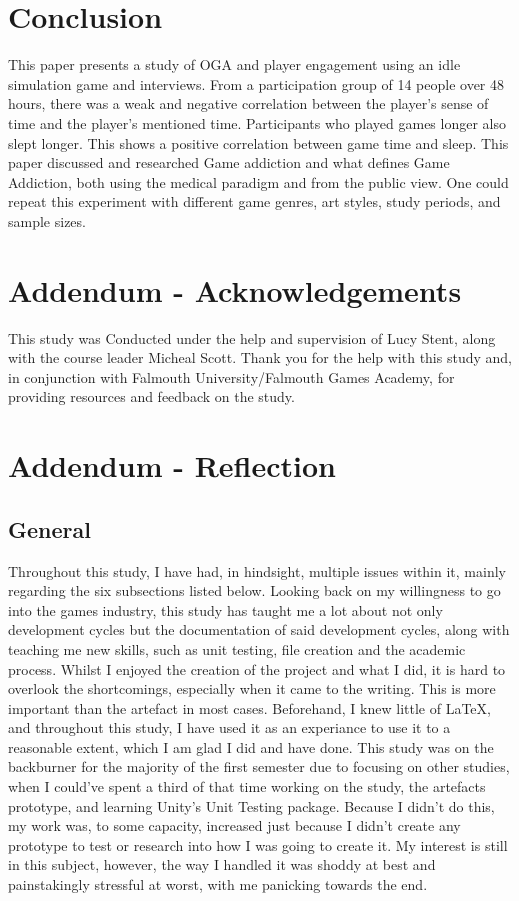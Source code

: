 \documentclass[conference]{IEEEtran}
\begin{document}
\section{Conclusion}
This paper presents a study of OGA and player engagement using an idle simulation game and interviews. From a participation group of 14 people over 48 hours, there was a weak and negative correlation between the player’s sense of time and the player’s mentioned time. Participants who played games longer also slept longer. This shows a positive correlation between game time and sleep. This paper discussed and researched Game addiction and what defines Game Addiction, both using the medical paradigm and from the public view. One could repeat this experiment with different game genres, art styles, study periods, and sample sizes.


 
\section{Addendum - Acknowledgements}
This study was Conducted under the help and supervision of Lucy Stent, along with the course leader Micheal Scott. Thank you for the help with this study and, in conjunction with Falmouth University/Falmouth Games Academy, for providing resources and feedback on the study.
\section {Addendum - Reflection}
\subsection{General}
Throughout this study, I have had, in hindsight, multiple issues within it, mainly regarding the six subsections listed below. Looking back on my willingness to go into the games industry, this study has taught me a lot about not only development cycles but the documentation of said development cycles, along with teaching me new skills, such as unit testing, file creation and the academic process. Whilst I enjoyed the creation of the project and what I did, it is hard to overlook the shortcomings, especially when it came to the writing. This is more important than the artefact in most cases. Beforehand, I knew little of \LaTeX, and throughout this study, I have used it as an experiance to use it to a reasonable extent, which I am glad I did and have done. This study was on the backburner for the majority of the first semester due to focusing on other studies, when I could've spent a third of that time working on the study, the artefacts prototype, and learning Unity's Unit Testing package. Because I didn't do this, my work was, to some capacity, increased just because I didn't create any prototype to test or research into how I was going to create it. My interest is still in this subject, however, the way I handled it was shoddy at best and painstakingly stressful at worst, with me panicking towards the end.
\end{document}
